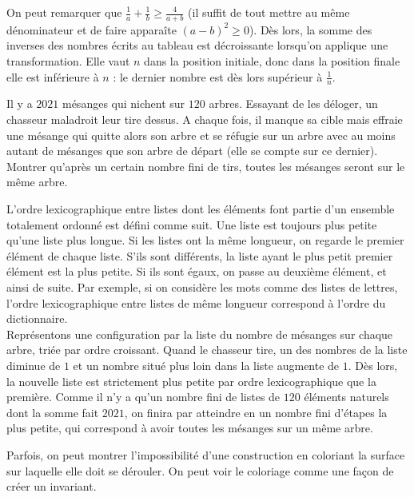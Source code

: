\begin{sol}
On peut remarquer que $\frac1{a}+\frac1{b}\geq \frac{4}{a+b}$ (il suffit de tout mettre au même dénominateur et de faire apparaîte $(a-b)^2\geq0$). Dès lors, la somme des inverses des nombres écrits au tableau est décroissante lorsqu'on applique une transformation. Elle vaut $n$ dans la position initiale, donc dans la position finale elle est inférieure à $n$ : le dernier nombre est dès lors supérieur à $\frac1{n}$.
\end{sol}

\begin{exo}
Il y a $2021$ mésanges qui nichent sur $120$ arbres. Essayant de les déloger, un chasseur maladroit leur tire dessus. A chaque fois, il manque sa cible mais effraie une mésange qui quitte alors son arbre et se réfugie sur un arbre avec au moins autant de mésanges que son arbre de départ (elle se compte sur ce dernier). Montrer qu'après un certain nombre fini de tirs, toutes les mésanges seront sur le même arbre.
\end{exo}

\begin{sol}
L'ordre lexicographique entre listes dont les éléments font partie d'un ensemble totalement ordonné est défini comme suit. Une liste est toujours plus petite qu'une liste plus longue. Si les listes ont la même longueur, on regarde le premier élément de chaque liste. S'ils sont différents, la liste ayant le plus petit premier élément est la plus petite. Si ils sont égaux, on passe au deuxième élément, et ainsi de suite. Par exemple, si on considère les mots comme des listes de lettres, l'ordre lexicographique entre listes de même longueur correspond à l'ordre du dictionnaire.\\
Représentons une configuration par la liste du nombre de mésanges sur chaque arbre, triée par ordre croissant. Quand le chasseur tire, un des nombres de la liste diminue de $1$ et un nombre situé plus loin dans la liste augmente de $1$. Dès lors, la nouvelle liste est strictement plus petite par ordre lexicographique que la première. Comme il n'y a qu'un nombre fini de listes de $120$ éléments naturels dont la somme fait $2021$, on finira par atteindre en un nombre fini d'étapes la plus petite, qui correspond à avoir toutes les mésanges sur un même arbre.
\end{sol}


Parfois, on peut montrer l'impossibilité d'une construction en coloriant la surface sur laquelle elle doit se dérouler. On peut voir le coloriage comme une façon de créer un invariant.\\

